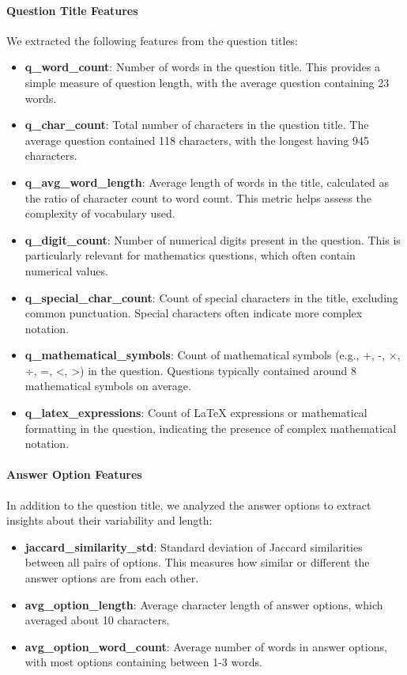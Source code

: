 \documentclass[11pt]{article}
\begin{document}
\paragraph{Question Title Features}
We extracted the following features from the question titles:
\begin{itemize}
    \item \textbf{q\_word\_count}: Number of words in the question title. This provides a simple measure of question length, with the average question containing 23 words.
    \item \textbf{q\_char\_count}: Total number of characters in the question title. The average question contained 118 characters, with the longest having 945 characters.
    \item \textbf{q\_avg\_word\_length}: Average length of words in the title, calculated as the ratio of character count to word count. This metric helps assess the complexity of vocabulary used.
    \item \textbf{q\_digit\_count}: Number of numerical digits present in the question. This is particularly relevant for mathematics questions, which often contain numerical values.
    \item \textbf{q\_special\_char\_count}: Count of special characters in the title, excluding common punctuation. Special characters often indicate more complex notation.
    \item \textbf{q\_mathematical\_symbols}: Count of mathematical symbols (e.g., +, -, ×, ÷, =, <, >) in the question. Questions typically contained around 8 mathematical symbols on average. %
    \item \textbf{q\_latex\_expressions}: Count of LaTeX expressions or mathematical formatting in the question, indicating the presence of complex mathematical notation.
\end{itemize}

\paragraph{Answer Option Features}
In addition to the question title, we analyzed the answer options to extract insights about their variability and length:
\begin{itemize}
    \item \textbf{jaccard\_similarity\_std}: Standard deviation of Jaccard similarities between all pairs of options. This measures how similar or different the answer options are from each other.
    \item \textbf{avg\_option\_length}: Average character length of answer options, which averaged about 10 characters.
    \item \textbf{avg\_option\_word\_count}: Average number of words in answer options, with most options containing between 1-3 words.
\end{itemize}
\end{document}
